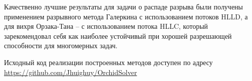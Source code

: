 \documentclass[14pt, a4paper, fleqn]{extreport}
\begin{document}
	Качественно лучшие результаты для задачи о распаде разрыва
	были получены применением разрывного метода Галеркина 
	с использованием потоков HLLD,
	а для вихря Орзака-Тана -- с использованием потока HLLC, который
	зарекомендовал себя как наиболее устойчивый при хорошей 
	разрешающей способности для многомерных задач.
	
	Исходный код реализации построенных методов
	доступен по адресу \url{https://github.com/Jhuighuy/OrchidSolver}
	
	
	\clearpage
	
	
	
	
	
	
	
	
\end{document}

